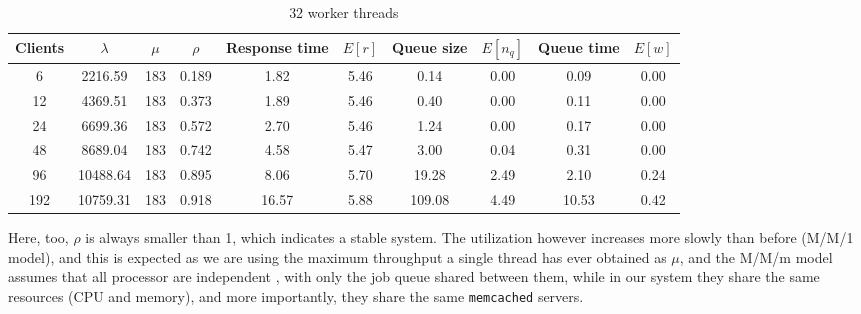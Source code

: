 \documentclass[11pt,a4paper]{article}
\renewcommand{\t}[1]{%
	{\texttt{#1}}}
\begin{document}
\begin{table}[H]
\centering
\begin{tabular}{@{}c|ccc|cc|cc|cc@{}}
\toprule
Clients & $\lambda$ & $\mu$ & $\rho$ & Response time & $E[r]$ & Queue size & $E[n_q]$ & Queue time & $E[w]$ \\ \midrule
6 & 2216.59 & 183 & 0.189 & 1.82 & 5.46 & 0.14 & 0.00 & 0.09 & 0.00 \\
12 & 4369.51 & 183 & 0.373 & 1.89 & 5.46 & 0.40 & 0.00 & 0.11 & 0.00 \\
24 & 6699.36 & 183 & 0.572 & 2.70 & 5.46 & 1.24 & 0.00 & 0.17 & 0.00 \\
48 & 8689.04 & 183 & 0.742 & 4.58 & 5.47 & 3.00 & 0.04 & 0.31 & 0.00 \\
96 & 10488.64 & 183 & 0.895 & 8.06 & 5.70 & 19.28 & 2.49 & 2.10 & 0.24 \\
192 & 10759.31 & 183 & 0.918 & 16.57 & 5.88 & 109.08 & 4.49 & 10.53 & 0.42 \\ \bottomrule
\end{tabular}
\caption{32 worker threads}
\label{my-label}
\end{table}


Here, too, $\rho$ is always smaller than 1, which indicates a stable system.
The utilization however increases more slowly than before (M/M/1 model), and
this is expected as we are using the maximum throughput a single thread has
ever obtained as $\mu$, and the M/M/m model assumes that all processor are
independent , with only the job queue shared between them, while in our system
they share the same resources (CPU and memory), and more importantly, they
share the same \t{memcached} servers.  
\end{document}
